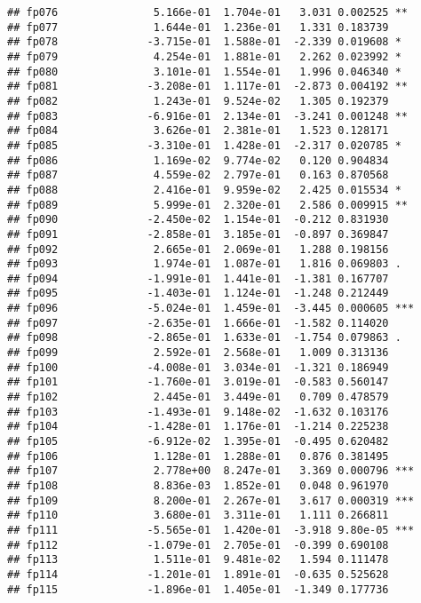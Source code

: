 \documentclass[]{article}
\begin{document}
\begin{verbatim}
## fp076               5.166e-01  1.704e-01   3.031 0.002525 ** 
## fp077               1.644e-01  1.236e-01   1.331 0.183739    
## fp078              -3.715e-01  1.588e-01  -2.339 0.019608 *  
## fp079               4.254e-01  1.881e-01   2.262 0.023992 *  
## fp080               3.101e-01  1.554e-01   1.996 0.046340 *  
## fp081              -3.208e-01  1.117e-01  -2.873 0.004192 ** 
## fp082               1.243e-01  9.524e-02   1.305 0.192379    
## fp083              -6.916e-01  2.134e-01  -3.241 0.001248 ** 
## fp084               3.626e-01  2.381e-01   1.523 0.128171    
## fp085              -3.310e-01  1.428e-01  -2.317 0.020785 *  
## fp086               1.169e-02  9.774e-02   0.120 0.904834    
## fp087               4.559e-02  2.797e-01   0.163 0.870568    
## fp088               2.416e-01  9.959e-02   2.425 0.015534 *  
## fp089               5.999e-01  2.320e-01   2.586 0.009915 ** 
## fp090              -2.450e-02  1.154e-01  -0.212 0.831930    
## fp091              -2.858e-01  3.185e-01  -0.897 0.369847    
## fp092               2.665e-01  2.069e-01   1.288 0.198156    
## fp093               1.974e-01  1.087e-01   1.816 0.069803 .  
## fp094              -1.991e-01  1.441e-01  -1.381 0.167707    
## fp095              -1.403e-01  1.124e-01  -1.248 0.212449    
## fp096              -5.024e-01  1.459e-01  -3.445 0.000605 ***
## fp097              -2.635e-01  1.666e-01  -1.582 0.114020    
## fp098              -2.865e-01  1.633e-01  -1.754 0.079863 .  
## fp099               2.592e-01  2.568e-01   1.009 0.313136    
## fp100              -4.008e-01  3.034e-01  -1.321 0.186949    
## fp101              -1.760e-01  3.019e-01  -0.583 0.560147    
## fp102               2.445e-01  3.449e-01   0.709 0.478579    
## fp103              -1.493e-01  9.148e-02  -1.632 0.103176    
## fp104              -1.428e-01  1.176e-01  -1.214 0.225238    
## fp105              -6.912e-02  1.395e-01  -0.495 0.620482    
## fp106               1.128e-01  1.288e-01   0.876 0.381495    
## fp107               2.778e+00  8.247e-01   3.369 0.000796 ***
## fp108               8.836e-03  1.852e-01   0.048 0.961970    
## fp109               8.200e-01  2.267e-01   3.617 0.000319 ***
## fp110               3.680e-01  3.311e-01   1.111 0.266811    
## fp111              -5.565e-01  1.420e-01  -3.918 9.80e-05 ***
## fp112              -1.079e-01  2.705e-01  -0.399 0.690108    
## fp113               1.511e-01  9.481e-02   1.594 0.111478    
## fp114              -1.201e-01  1.891e-01  -0.635 0.525628    
## fp115              -1.896e-01  1.405e-01  -1.349 0.177736    

\end{verbatim}
\end{document}
